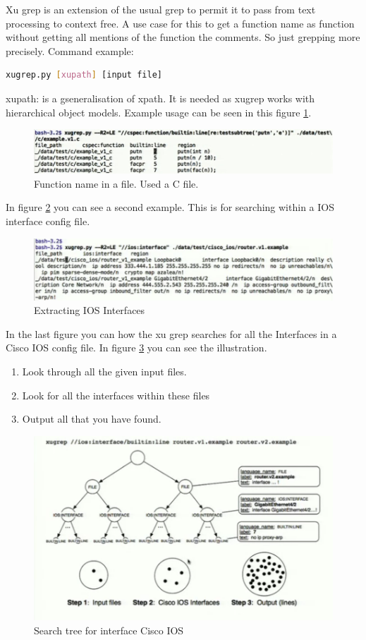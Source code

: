 Xu grep is an extension of the usual grep to permit it to pass from text processing to context free. A use case for this to get a function name as function without getting all mentions of the function the comments. So just grepping more precisely.
Command example:
\begin{lstlisting}[language=bash]
   xugrep.py [xupath] [input file]
\end{lstlisting}

xupath: is a gseneralisation of xpath. It is needed as xugrep works with hierarchical object models.
Example usage can be seen in this figure \ref{example1xugrep}.

\begin{figure}
\label{example1xugrep}
\caption{Function name in a file. Used a C file.}
\includegraphics[width=\textwidth]{images/example1xugrep.jpg}
\end{figure}

In figure \ref{fig:example2xugrep} you can see a second example. This is for searching within a IOS interface config file.

\begin{figure}
\label{fig:example2xugrep}
\caption{Extracting IOS Interfaces}
\includegraphics[width=\textwidth]{images/example2xugrep.png}
\end{figure}

In the last figure you can how the xu grep searches for all the Interfaces in a Cisco IOS config file. In figure \ref{fig:example3xugrep} you can see the illustration.
\begin{enumerate}
\item Look through all the given input files.
\item Look for all the interfaces within these files
\item Output all that you have found. 
\end{enumerate}

\begin{figure}
\label{fig:example3xugrep}
\caption{Search tree for interface Cisco IOS}
\includegraphics[width=\textwidth]{images/example3xugrep.png}
\end{figure}